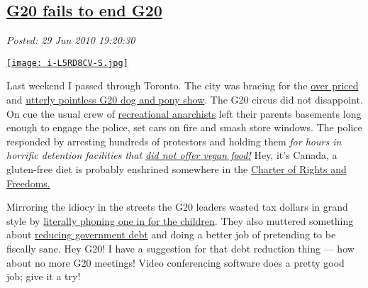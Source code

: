 %

\subsection*{\href{https://bakerjd99.wordpress.com/2010/06/29/g20-fails-to-end-g20/}{G20 fails to end G20}}


\noindent\emph{Posted: 29 Jun 2010 19:20:30}
\vspace{6pt}

\captionsetup[floatingfigure]{labelformat=empty}
\begin{floatingfigure}[l]{0.25\textwidth}
\centering
\href{http://www.jacketflap.com/megablog/index.asp?blogid=79}{\texttt{[image: i-L5RD8CV-S.jpg]}}
\label{fig:648X0}
\end{floatingfigure}Last
weekend I passed through Toronto. The city was bracing for the
\href{http://www.msnbc.msn.com/id/37901237/ns/world\_news-americas/}{over
priced} and
\href{http://blogs.the-american-interest.com/wrm/2010/06/25/pointless-g-20-summit-unfolds-in-toronto/}{utterly
pointless G20 dog and pony show}. The G20 circus did not disappoint. On
cue the usual crew of
\href{http://www.calgarysun.com/news/g20/2010/06/28/14549321.html}{recreational
anarchists} left their parents basements long enough to engage the
police, set cars on fire and smash store windows. The police responded
by arresting hundreds of protestors and holding them \emph{for hours in
horrific detention facilities that
\href{http://torontoist.com/2010/06/g20\_dispatches\_everyone\_loses.php}{did
not offer vegan food!}} Hey, it's Canada, a gluten-free diet is probably
enshrined somewhere in the
\href{http://laws.justice.gc.ca/en/charter/}{Charter of Rights and
Freedoms.}

Mirroring the idiocy in the streets the G20 leaders wasted tax dollars
in grand style by
\href{http://www.rhrealitycheck.org/blog/2010/06/29/roundup-promises-protestors-promoting-maternal-child-health}{literally
phoning one in for the children}. They also muttered something about
\href{http://nbbusinessjournal.canadaeast.com/front/article/1114209}{reducing
government debt} and doing a better job of pretending to be fiscally
sane. Hey G20! I have a suggestion for that debt reduction thing --- how
about no more G20 meetings! Video conferencing software does a pretty
good job; give it a try!


